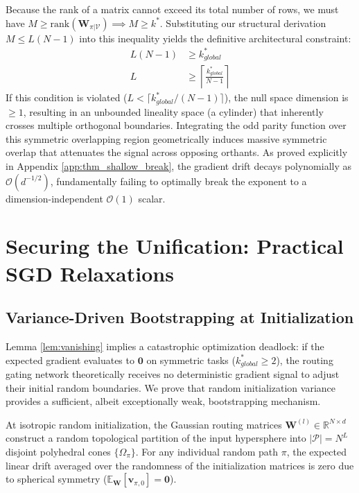 \documentclass{article}
\newcommand{\E}{\mathbb{E}}
\newcommand{\R}{\mathbb{R}}
\newcommand{\1}{\mathbb{I}}
\newcommand{\calO}{\mathcal{O}}
\newcommand{\calP}{\mathcal{P}}
\newcommand{\bv}{\mathbf{v}}
\newcommand{\bW}{\mathbf{W}}
\newcommand{\rank}{\mathrm{rank}}
\begin{document}
Because the rank of a matrix cannot exceed its total number of rows, we must have $M \ge \rank(\bW_{\pi|\mathcal{V}}) \implies M \ge k^*$. Substituting our structural derivation $M \le L(N-1)$ into this inequality yields the definitive architectural constraint:
\begin{align}
    L(N-1) &\ge k_{global}^* \nonumber \\
    L &\ge \left\lceil \frac{k_{global}^*}{N-1} \right\rceil
\end{align}
If this condition is violated ($L < \lceil k_{global}^* / (N-1) \rceil$), the null space dimension is $\ge 1$, resulting in an unbounded lineality space (a cylinder) that inherently crosses multiple orthogonal boundaries. Integrating the odd parity function over this symmetric overlapping region geometrically induces massive symmetric overlap that attenuates the signal across opposing orthants. As proved explicitly in Appendix \ref{app:thm_shallow_break}, the gradient drift decays polynomially as $\calO(d^{-1/2})$, fundamentally failing to optimally break the exponent to a dimension-independent $\calO(1)$ scalar.

\section{Securing the Unification: Practical SGD Relaxations}
\label{app:relaxations}

\subsection{Variance-Driven Bootstrapping at Initialization}
\label{app:defense_init}

Lemma \ref{lem:vanishing} implies a catastrophic optimization deadlock: if the expected gradient evaluates to $\mathbf{0}$ on symmetric tasks ($k_{global}^* \ge 2$), the routing gating network theoretically receives no deterministic gradient signal to adjust their initial random boundaries. We prove that random initialization variance provides a sufficient, albeit exceptionally weak, bootstrapping mechanism.

At isotropic random initialization, the Gaussian routing matrices $\bW^{(l)} \in \R^{N \times d}$ construct a random topological partition of the input hypersphere into $|\calP| = N^L$ disjoint polyhedral cones $\{\Omega_\pi\}$. For any individual random path $\pi$, the expected linear drift averaged over the randomness of the initialization matrices is zero due to spherical symmetry ($\E_\bW[\bv_{\pi, 0}] = \mathbf{0}$).
\end{document}
